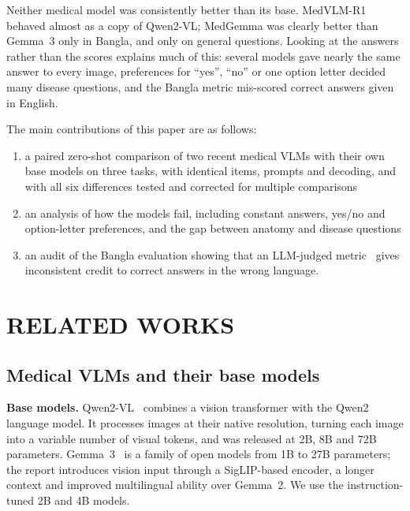 \documentclass[doublecolumn]{ijcvsplatex}
\newcommand{\qwen}{Qwen2-VL}
\newcommand{\medvlm}{MedVLM-R1}
\newcommand{\gemma}{Gemma~3}
\newcommand{\medgemma}{MedGemma}
\begin{document}
Neither medical model was consistently better than its base. \medvlm{} behaved almost as a copy of \qwen{}; \medgemma{} was clearly better than \gemma{} only in Bangla, and only on general questions. Looking at the answers rather than the scores explains much of this: several models gave nearly the same answer to every image, preferences for ``yes'', ``no'' or one option letter decided many disease questions, and the Bangla metric mis-scored correct answers given in English.

The main contributions of this paper are as follows:
\begin{enumerate}
    \item a paired zero-shot comparison of two recent medical VLMs with their own base models on three tasks, with identical items, prompts and decoding, and with all six differences tested and corrected for multiple comparisons
    \item an analysis of how the models fail, including constant answers, yes/no and option-letter preferences, and the gap between anatomy and disease questions
    \item an audit of the Bangla evaluation showing that an LLM-judged metric~\cite{manas2024lave} gives inconsistent credit to correct answers in the wrong language.
\end{enumerate}


\section{RELATED WORKS}
\label{sec_rl}

\subsection{Medical VLMs and their base models}
\textbf{Base models.} \qwen{}~\cite{wang2024qwen2vl} combines a vision transformer with the Qwen2 language model. It processes images at their native resolution, turning each image into a variable number of visual tokens, and was released at 2B, 8B and 72B parameters. \gemma{}~\cite{gemma3} is a family of open models from 1B to 27B parameters; the report introduces vision input through a SigLIP-based encoder, a longer context and improved multilingual ability over Gemma~2. We use the instruction-tuned 2B and 4B models.
\end{document}
